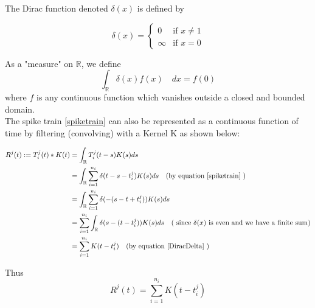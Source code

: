 The Dirac  function denoted $\delta(x)$ is defined by
\begin{Def}
\[
  \delta(x) =
  \begin{cases}
                                   0 & \text{if $x \neq 1$} \\
                                   \infty & \text{if $x=0$} 
  \end{cases}
\]
\end{Def}
As a "measure" on $\mathbb{R}$, we define
\begin{equation} \label{DiracDelta}
\displaystyle \int_{\mathbb{R}}  \delta(x)f(x) \quad dx = f(0) 
\end{equation}
where $f$ is any continuous function which vanishes outside a closed 
and bounded domain.\\






The  spike train \eqref{spiketrain} can also be represented as a continuous function of time by filtering (convolving) with a Kernel K as shown below:

\begin{align*}
\displaystyle
R^{j}(t) := T_{i}^{j}(t)*K(t) &= \int_{\mathbb{R}} T_{i}^{j}(t-s)K(s)  ds \\
& = \int_{\mathbb{R}}    \sum_{i=1}^{n_{i}} \delta(t - s -t_{i}^{j}) K(s)  ds 
\quad (\text{by equation \ref{spiketrain}  })  \\
& =  \int_{\mathbb{R}}    \sum_{i=1}^{n_{i}} \delta( -(s - t + t_{i}^{j})) K(s)  ds\\
& =  \sum_{i=1}^{n_{i}}   \int_{\mathbb{R}} \delta(s - (t - t_{i}^{j})) K(s)  ds \quad (\text{ since $\delta(x)$ is even and we have a finite sum})\\
& = \sum_{i=1}^{n_{i}} K(t-t^{j}_{i}) \quad (\text{by equation \ref{DiracDelta} })
\end{align*}

Thus
\begin{equation} \label{firerate}
R^{j}(t) = \sum_{i=1}^{n_{i}} K(t-t^{j}_{i})
\end{equation}


